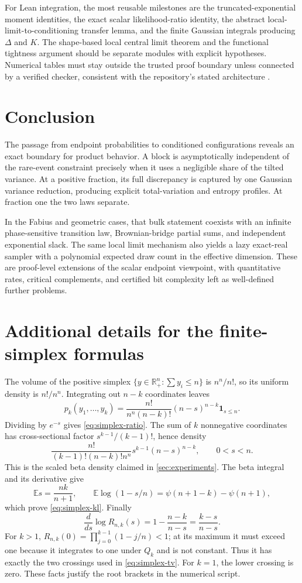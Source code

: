 \documentclass[11pt,a4paper]{article}
\numberwithin{equation}{section}
\theoremstyle{definition}
\theoremstyle{remark}
\newcommand{\R}{\mathbb R}
\newcommand{\E}{\mathbb E}
\newcommand{\ind}{\mathbf 1}
\begin{document}
For Lean integration, the most reusable milestones are the
truncated-exponential moment identities, the exact scalar
likelihood-ratio identity, the abstract local-limit-to-conditioning
transfer lemma, and the finite Gaussian integrals producing
$\Delta$ and $K$. The shape-based local central limit theorem and the
functional tightness argument should be separate modules with
explicit hypotheses. Numerical tables must stay outside the
trusted proof boundary unless connected by a verified checker,
consistent with the repository's stated architecture \cite{repo}.

\section{Conclusion}
The passage from endpoint probabilities to conditioned
configurations reveals an exact boundary for product behavior.
A block is asymptotically independent of the rare-event constraint
precisely when it uses a negligible share of the tilted variance.
At a positive fraction, its full discrepancy is captured by one
Gaussian variance reduction, producing explicit total-variation
and entropy profiles. At fraction one the two laws separate.

In the Fabius and geometric cases, that bulk statement coexists
with an infinite phase-sensitive transition law, Brownian-bridge
partial sums, and independent exponential slack. The same local
limit mechanism also yields a lazy exact-real sampler with a
polynomial expected draw count in the effective dimension. These
are proof-level extensions of the scalar endpoint viewpoint,
with quantitative rates, critical complements, and certified bit
complexity left as well-defined further problems.

\appendix
\section{Additional details for the finite-simplex formulas}
\label{app:simplex}
The volume of the positive simplex
$\{y\in\R_+^n:\sum y_i\le n\}$ is $n^n/n!$, so its uniform
density is $n!/n^n$. Integrating out $n-k$ coordinates leaves
\[
 p_k(y_1,\ldots,y_k)
 =\frac{n!}{n^n(n-k)!}(n-s)^{n-k}\ind_{s\le n}.
\]
Dividing by $e^{-s}$ gives \cref{eq:simplex-ratio}.
The sum of $k$ nonnegative coordinates has cross-sectional factor
$s^{k-1}/(k-1)!$, hence density
\[
 \frac{n!}{(k-1)!(n-k)!n^n}s^{k-1}(n-s)^{n-k},\qquad0<s<n.
\]
This is the scaled beta density claimed in
\cref{sec:experiments}. The beta integral and its derivative give
\[
 \E s=\frac{nk}{n+1},\qquad
 \E\log(1-s/n)=\psi(n+1-k)-\psi(n+1),
\]
which prove \cref{eq:simplex-kl}. Finally
\[
 \frac{d}{ds}\log R_{n,k}(s)=1-\frac{n-k}{n-s}
 =\frac{k-s}{n-s}.
\]
For $k>1$, $R_{n,k}(0)=\prod_{j=0}^{k-1}(1-j/n)<1$;
at its maximum it must exceed one because it integrates to one
under $Q_k$ and is not constant. Thus it has exactly the two
crossings used in \cref{eq:simplex-tv}. For $k=1$, the lower
crossing is zero. These facts justify the root brackets in the
numerical script.
\end{document}
